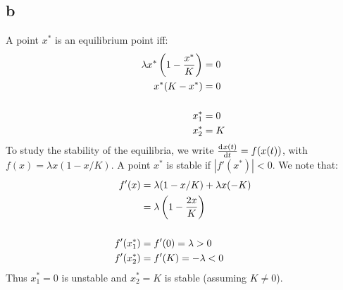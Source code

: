 \subsection*{b}
A point \( x^* \) is an equilibrium point iff:
\begin{align*}
    \lambda x^* \del{1 - \frac{x^*}{K}} &= 0 \\
    x^* (K - x^*) &= 0 \\
    \\
    x_{1}^{*} &= 0 \\
    x_{2}^{*} &= K
\end{align*}
To study the stability of the equilibria, we write \( \od{x(t)}{t} = f(x(t)) \), with \( f(x) = \lambda x (1 - x/K) \). A point \( x^{*} \) is stable if \( |f'(x^{*})| < 0 \). We note that:
\begin{align*}
    f'(x) &= \lambda(1 - x/K) + \lambda x (-K) \\
          &= \lambda \del{1 - \frac{2x}{K}} \\
    \\
    f'(x_{1}^{*}) &= f'(0) = \lambda > 0 \\
    f'(x_{2}^{*}) &= f'(K) = -\lambda < 0
\end{align*}
Thus \( x_{1}^{*} = 0 \) is unstable and \( x_{2}^{*} = K \) is stable (assuming \( K \neq 0 \)).
